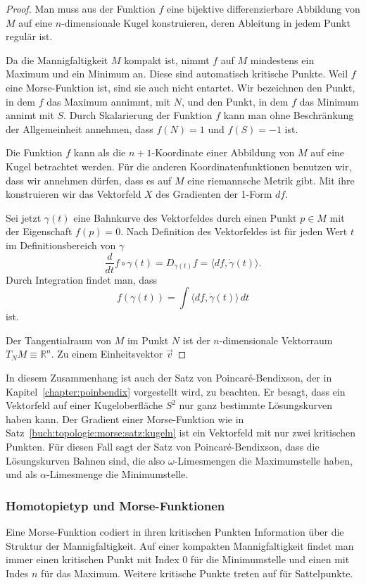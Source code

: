 \begin{proof}
Man muss aus der Funktion $f$ eine bijektive differenzierbare Abbildung
von $M$ auf eine $n$-dimensionale Kugel konstruieren, deren Ableitung
in jedem Punkt regulär ist.

Da die Mannigfaltigkeit $M$ kompakt ist, nimmt $f$ auf $M$ mindestens
ein Maximum und ein Minimum an.
Diese sind automatisch kritische Punkte.
Weil $f$ eine Morse-Funktion ist, sind sie auch nicht entartet.
Wir bezeichnen den Punkt, in dem $f$ das Maximum annimmt, mit $N$,
und den Punkt, in dem $f$ das Minimum annimt mit $S$.
Durch Skalarierung der Funktion $f$ kann man ohne Beschränkung der
Allgemeinheit annehmen, dass $f(N)=1$ und $f(S) = -1$ ist.

Die Funktion $f$ kann als die $n+1$-Koordinate einer Abbildung von $M$ 
auf eine Kugel betrachtet werden.
Für die anderen Koordinatenfunktionen benutzen wir, dass wir annehmen
dürfen, dass es auf $M$ eine riemannsche Metrik gibt.
Mit ihre konstruieren wir das Vektorfeld $X$ des Gradienten der 1-Form $df$.

Sei jetzt $\gamma(t)$ eine Bahnkurve des Vektorfeldes durch einen Punkt
$p\in M$ mit der Eigenschaft $f(p)=0$.
Nach Definition des Vektorfeldes ist für jeden Wert $t$ im Definitionsbereich
von $\gamma$
\[
\frac{d}{dt}f\circ\gamma(t)
=
D_{\dot{\gamma}(t)} f
=
\langle df, \dot{\gamma}(t) \rangle.
\]
Durch Integration findet man, dass
\[
f(\gamma(t))
=
\int \langle df,\dot{\gamma}(t)\rangle \,dt
\]
ist.



Der Tangentialraum von $M$ im Punkt $N$ ist der
$n$-dimensionale Vektorraum $T_NM\equiv \mathbb{R}^n$.
Zu einem Einheitsvektor $\vec{v}$ 

\end{proof}

In diesem Zusammenhang ist auch der Satz von Poincaré-Bendixson,
der in Kapitel~\ref{chapter:poinbendix} vorgestellt wird, zu beachten.
Er besagt, dass ein Vektorfeld auf einer Kugeloberfläche $S^2$ nur
ganz bestimmte Lösungskurven haben kann.
Der Gradient einer Morse-Funktion wie in
Satz~\ref{buch:topologie:morse:satz:kugeln}
ist ein Vektorfeld mit nur zwei kritischen Punkten.
Für diesen Fall sagt der Satz von Poincaré-Bendixson, dass die
Lösungskurven Bahnen sind, die also $\omega$-Limesmengen die 
Maximumstelle haben, und als $\alpha$-Limesmenge die Minimumstelle.

%
%
\subsubsection{Homotopietyp und Morse-Funktionen}
Eine Morse-Funktion codiert in ihren kritischen Punkten Information
über die Struktur der Mannigfaltigkeit.
Auf einer kompakten Mannigfaltigkeit findet man immer einen kritischen
Punkt mit Index $0$ für die Minimumstelle und einen mit Indes $n$ für
das Maximum.
Weitere kritische Punkte treten auf für Sattelpunkte.

